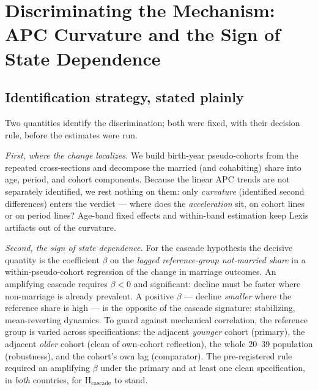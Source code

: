 \section{Discriminating the Mechanism: APC Curvature and the Sign of State
Dependence}
\label{sec:discrimination}

\subsection{Identification strategy, stated plainly}
\label{sec:idstrategy}

Two quantities identify the discrimination; both were fixed, with their decision
rule, before the estimates were run.

\emph{First, where the change localizes.} We build birth-year pseudo-cohorts
from the repeated cross-sections and decompose the married (and cohabiting)
share into age, period, and cohort components. Because the linear APC trends
are not separately identified, we rest nothing on them: only
\emph{curvature} (identified second differences) enters the verdict --- where
does the \emph{acceleration} sit, on cohort lines or on period lines? Age-band
fixed effects and within-band estimation keep Lexis artifacts out of the
curvature.

\emph{Second, the sign of state dependence.} For the cascade hypothesis the
decisive quantity is the coefficient $\beta$ on the \emph{lagged reference-group
not-married share} in a within-pseudo-cohort regression of the change in
marriage outcomes. An amplifying cascade requires $\beta < 0$ and significant:
decline must be faster where non-marriage is already prevalent. A positive
$\beta$ --- decline \emph{smaller} where the reference share is high --- is the
opposite of the cascade signature: stabilizing, mean-reverting dynamics. To
guard against mechanical correlation, the reference group is varied across
specifications: the adjacent \emph{younger} cohort (primary), the adjacent
\emph{older} cohort (clean of own-cohort reflection), the whole 20--39
population (robustness), and the cohort's own lag (comparator). The
pre-registered rule required an amplifying $\beta$ under the primary and at
least one clean specification, in \emph{both} countries, for
H$_{\text{cascade}}$ to stand.

